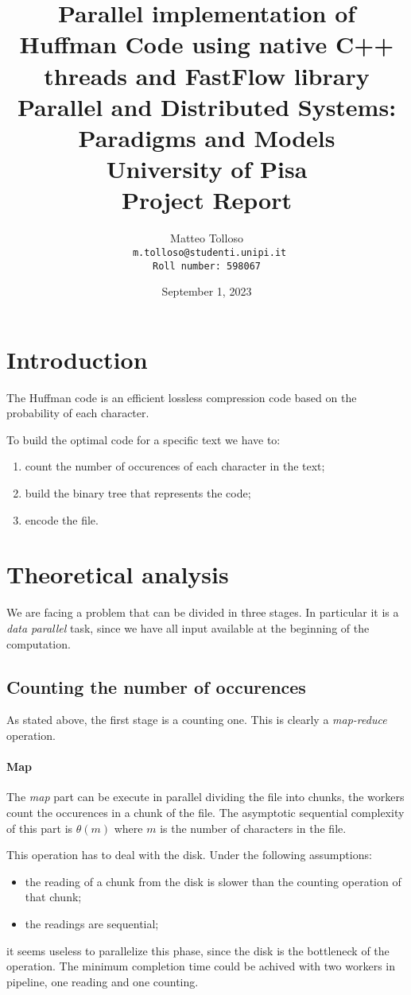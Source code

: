 \documentclass[12pt, letterpaper]{article}  %
\title{\vspace{2cm}\textbf{Parallel implementation of Huffman Code using native C++ threads and FastFlow library} \\
        \bigskip
        \Large{
            \medskip
            Parallel and Distributed Systems: Paradigms and Models \\
            \medskip
            University of Pisa \\
            \medskip
            Project Report\\
            \medskip
        }
}
\author{
  {Matteo Tolloso}\\
  \texttt{ \scriptsize{m.tolloso@studenti.unipi.it}}\\
  \texttt{\scriptsize{Roll number: 598067}} \\
}
\begin{document}
\nocite{*}
\date{September 1, 2023}
\maketitle

\newpage

\section{Introduction}
The Huffman code is an efficient lossless compression code based on the probability of each character.

To build the optimal code for a specific text we have to:
\begin{enumerate}
    \item count the number of occurences of each character in the text;
    \item build the binary tree that represents the code;
    \item encode the file.
\end{enumerate}

\section{Theoretical analysis}

We are facing a problem that can be divided in three stages. In particular it is a \textit{data parallel} task, 
since we have all input available at the beginning of the computation.

\subsection{Counting the number of occurences}
As stated above, the first stage is a counting one. This is clearly a \textit{map-reduce} operation.

\paragraph*{Map}
The \textit{map} part can be execute in parallel dividing the file into chunks, the workers count the occurences 
in a chunk of the file. The asymptotic sequential complexity of this part is $\theta(m)$ where $m$ is the number of characters in the file.

This operation has to deal with the disk. Under the following assumptions:
\begin{itemize}
    \item the reading of a chunk from  the disk is slower than the counting operation of that chunk;
    \item the readings are sequential;
\end{itemize}
it seems useless to parallelize this phase, since the disk is the bottleneck of the operation.
The minimum completion time could be achived with two workers in pipeline, one reading and one counting.
\end{document}
